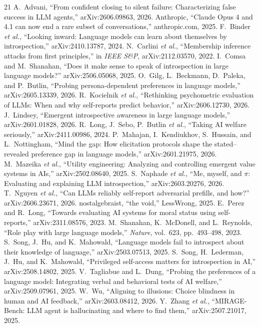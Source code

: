 \documentclass[10pt,a4paper]{article}
\begin{document}
\begin{thebibliography}{21}\small
{} A.~Advani, ``From confident closing to silent failure: Characterizing false success in LLM agents,'' arXiv:2606.09863, 2026.
 Anthropic, ``Claude Opus 4 and 4.1 can now end a rare subset of conversations,'' anthropic.com, 2025.
 F.~Binder \emph{et al.}, ``Looking inward: Language models can learn about themselves by introspection,'' arXiv:2410.13787, 2024.
 N.~Carlini \emph{et al.}, ``Membership inference attacks from first principles,'' in \emph{IEEE S\&P}, arXiv:2112.03570, 2022.
 I.~Comsa and M.~Shanahan, ``Does it make sense to speak of introspection in large language models?'' arXiv:2506.05068, 2025.
 O.~Gilg, L.~Beckmann, D.~Paleka, and P.~Butlin, ``Probing persona-dependent preferences in language models,'' arXiv:2605.13339, 2026.
 R.~Kocielnik \emph{et al.}, ``Rethinking psychometric evaluation of LLMs: When and why self-reports predict behavior,'' arXiv:2606.12730, 2026.
 J.~Lindsey, ``Emergent introspective awareness in large language models,'' arXiv:2601.01828, 2026.
 R.~Long, J.~Sebo, P.~Butlin \emph{et al.}, ``Taking AI welfare seriously,'' arXiv:2411.00986, 2024.
 P.~Mahajan, I.~Kendiukhov, S.~Hussain, and L.~Nottingham, ``Mind the gap: How elicitation protocols shape the stated--revealed preference gap in language models,'' arXiv:2601.21975, 2026.
 M.~Mazeika \emph{et al.}, ``Utility engineering: Analyzing and controlling emergent value systems in AIs,'' arXiv:2502.08640, 2025.
 S.~Naphade \emph{et al.}, ``Me, myself, and $\pi$: Evaluating and explaining LLM introspection,'' arXiv:2603.20276, 2026.
 T.~Nguyen \emph{et al.}, ``Can LLMs reliably self-report adversarial prefills, and how?'' arXiv:2606.23671, 2026.
 nostalgebraist, ``the void,'' LessWrong, 2025.
 E.~Perez and R.~Long, ``Towards evaluating AI systems for moral status using self-reports,'' arXiv:2311.08576, 2023.
 M.~Shanahan, K.~McDonell, and L.~Reynolds, ``Role play with large language models,'' \emph{Nature}, vol.~623, pp.~493--498, 2023.
 S.~Song, J.~Hu, and K.~Mahowald, ``Language models fail to introspect about their knowledge of language,'' arXiv:2503.07513, 2025.
 S.~Song, H.~Lederman, J.~Hu, and K.~Mahowald, ``Privileged self-access matters for introspection in AI,'' arXiv:2508.14802, 2025.
 V.~Tagliabue and L.~Dung, ``Probing the preferences of a language model: Integrating verbal and behavioral tests of AI welfare,'' arXiv:2509.07961, 2025.
 W.~Wu, ``Aligning to illusions: Choice blindness in human and AI feedback,'' arXiv:2603.08412, 2026.
 Y.~Zhang \emph{et al.}, ``MIRAGE-Bench: LLM agent is hallucinating and where to find them,'' arXiv:2507.21017, 2025.
\end{thebibliography}
\end{document}
